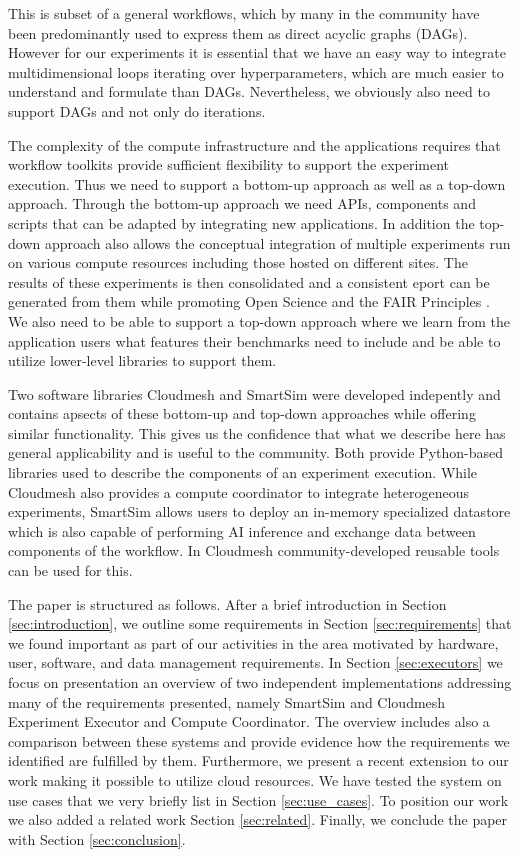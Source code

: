 \documentclass[sigconf]{acmart}
\begin{document}
This is subset of a general workflows, which by many in the community have been 
predominantly used to express them as direct acyclic graphs (DAGs). However for our experiments it is essential that we have an easy way to integrate multidimensional loops iterating over hyperparameters, which are much easier to understand and formulate than DAGs. Nevertheless, we obviously also need to support DAGs and not only do iterations.

The complexity of the compute infrastructure and the applications requires that workflow toolkits provide sufficient flexibility to support the experiment execution. Thus we need to support a bottom-up approach as well as a top-down approach. Through the bottom-up approach we need APIs, components and scripts that can be adapted by integrating new applications. In addition the top-down approach also allows the conceptual integration of multiple experiments run on various compute resources including those hosted on different sites. The results of these experiments is then consolidated and a consistent  eport can be generated from them while promoting Open Science and the FAIR Principles \citep{wilkinson2016fair}. We also need to be able to support a top-down approach where we learn from the application users what features their benchmarks need to include and be able to utilize lower-level libraries to support them.

Two software libraries Cloudmesh and SmartSim were developed indepently and contains apsects of these bottom-up and top-down approaches while offering similar functionality. This gives us the confidence that what we describe here has general applicability and is useful to the community. Both provide Python-based libraries used to describe the components of an experiment execution. While Cloudmesh also provides a compute coordinator to integrate heterogeneous experiments, SmartSim allows users to deploy an in-memory specialized datastore which is also capable of performing AI inference and exchange data between components of the workflow. In Cloudmesh \citep{cloudmesh-ee} community-developed reusable tools can be used for this.

The paper is structured as follows. After a brief introduction in Section \ref{sec:introduction}, we outline some requirements in Section \ref{sec:requirements} that we found important as part of our activities in the area motivated by hardware, user, software, and data management requirements. In  Section \ref{sec:executors} we focus on presentation an overview of two independent implementations addressing many of the requirements presented, namely SmartSim and Cloudmesh Experiment Executor and Compute Coordinator. The overview includes also a comparison between these systems and provide evidence how the requirements we identified are fulfilled by them. Furthermore, we present a recent extension to our work making it possible to utilize cloud resources.
We have tested the system on use cases that we very briefly list in Section \ref{sec:use_cases}.
To position our work we also added a related work Section \ref{sec:related}.
 Finally, we conclude the paper with Section \ref{sec:conclusion}.
\end{document}
